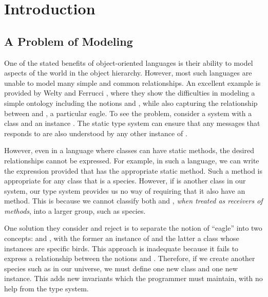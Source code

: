 \documentclass[10pt]{acm-sigplan}
\begin{document}
\section{Introduction}

\subsection{A Problem of Modeling}
One of the stated benefits of object-oriented languages is their
ability to model aspects of the world in the object hierarchy.
However, most such languages are unable to model many simple and
common relationships.  An excellent example is provided by Welty and
Ferrucci \cite{FW96}, where they show the difficulties in modeling
a simple ontology including the notions {} and
{}, while also capturing the relationship between
{} and {}, a particular eagle.  To see the
problem, consider a system with a class  and an instance
.  The static type system can ensure that any messages that
 responds to are also understood by any other instance of
.

However, even in a language where classes can have static methods, the
desired relationships cannot be expressed.  For example, in such a
language, we can write the expression \linebreak[4]
provided that  has the appropriate static method.  Such a
method is appropriate for any class that is a species.  However, if
 is another class in our system, our type system provides
us no way of requiring that it also have an 
method.  This is because we cannot classify both  and
, \emph{when treated as receivers of methods}, into a
larger group, such as species.

One solution they consider and reject is to separate the notion of
``eagle'' into two concepts: {} and {}, with
the former an instance of {} and the latter a class whose
instances are specific birds.  This approach is inadequate because it
fails to express a relationship between the notions {}
and {}.  Therefore, if we create another species such as
 in our universe, we must define one new class and one new
instance.  This adds new invariants which the programmer must
maintain, with no help from the type system.  
\end{document}
